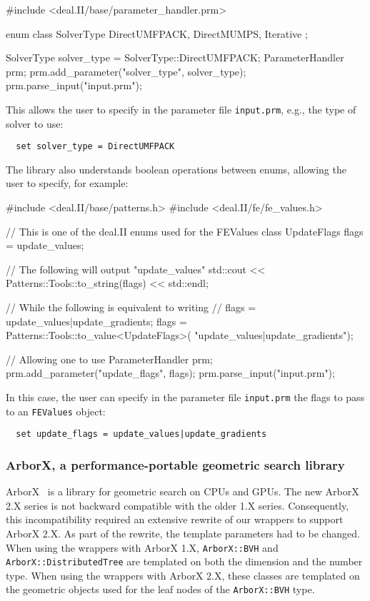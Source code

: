 \documentclass{ansarticle-preprint}
\begin{document}
\begin{c++}
  #include <deal.II/base/parameter_handler.prm>

  enum class SolverType {
    DirectUMFPACK,
    DirectMUMPS,
    Iterative
  };

  SolverType solver_type = SolverType::DirectUMFPACK;
  ParameterHandler prm;
  prm.add_parameter("solver_type", solver_type);
  prm.parse_input("input.prm");
\end{c++}

This allows the user to specify in the parameter file \verb|input.prm|, e.g., the type of solver to use:
\begin{verbatim}
  set solver_type = DirectUMFPACK
\end{verbatim}

The library also understands boolean operations between enums, allowing the user to specify, for example:
\begin{c++}
  #include <deal.II/base/patterns.h>
  #include <deal.II/fe/fe_values.h>

  // This is one of the deal.II enums used for the FEValues class
  UpdateFlags flags = update_values;

  // The following will output "update_values"
  std::cout << Patterns::Tools::to_string(flags)
            << std::endl;

  // While the following is equivalent to writing
  // flags = update_values|update_gradients;
  flags = Patterns::Tools::to_value<UpdateFlags>(
    "update_values|update_gradients");

  // Allowing one to use
  ParameterHandler prm;
  prm.add_parameter("update_flags", flags);
  prm.parse_input("input.prm");
\end{c++}

In this case, the user can specify in the parameter file \verb|input.prm| the flags to pass to an \verb|FEValues| object:
\begin{verbatim}
  set update_flags = update_values|update_gradients
\end{verbatim}

\subsubsection{ArborX, a performance-portable geometric search library}
ArborX~\cite{prokopenko2025} is a library for geometric search on CPUs and GPUs.
The new ArborX 2.X series is not backward compatible with the older 1.X series.
Consequently, this incompatibility required an extensive rewrite of our wrappers to
support ArborX 2.X. As part of the rewrite, the template parameters had to
be changed. When using the wrappers with ArborX 1.X, \texttt{ArborX::BVH}
and \texttt{ArborX::DistributedTree} are templated on both the dimension and
the number type. When using the wrappers with ArborX 2.X, these classes are
templated on the geometric objects used for the leaf nodes of the
\texttt{ArborX::BVH} type.
\end{document}
